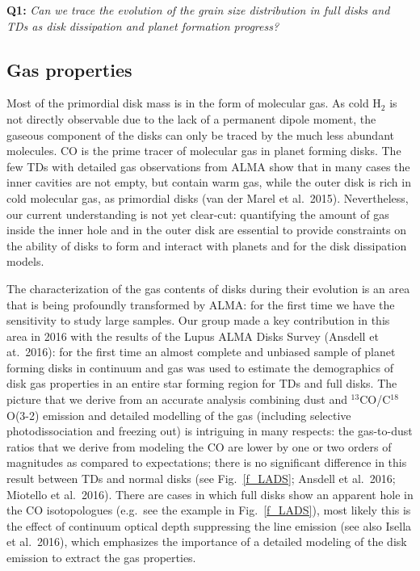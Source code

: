 \documentclass[10pt,fleqn,twoside]{article}
\begin{document}
\smallskip
{\bf Q1:} {\it Can we trace the evolution of the grain size distribution in full disks and TDs as disk dissipation and planet formation progress?}

\subsection{Gas properties}
Most of the primordial disk mass is in the form of molecular gas. As cold H$_2$ is not directly observable due to the lack of a permanent dipole moment, the gaseous component of the disks can only be traced by the much less abundant molecules. CO is the prime tracer of molecular gas in planet forming disks. The few TDs with detailed gas observations from ALMA show that in many cases the inner cavities are not empty, but contain warm gas, while the outer disk is rich in cold molecular gas, as primordial disks (van der Marel et al.~2015). Nevertheless, our current understanding is not yet clear-cut: quantifying the amount of gas inside the inner hole and in the outer disk are essential to provide constraints on the ability of disks to form and interact with planets and for the disk dissipation models.

The characterization of the gas contents of disks during their evolution is an area that is being profoundly transformed by ALMA: for the first time we have the sensitivity to study large samples.
Our group made a key contribution in this area in 2016 with the results of the Lupus ALMA Disks Survey
(Ansdell et at.~2016): for the first time an almost complete and unbiased sample of planet forming disks in continuum and gas was used to estimate the demographics of disk gas properties in an entire star forming region for TDs and full disks. The picture that we derive from an accurate analysis combining dust and $^{13}$CO/C$^{18}$O(3-2) emission and detailed modelling of the gas (including selective photodissociation and freezing out) is intriguing in many respects: the gas-to-dust ratios that we derive from modeling the CO are lower by one or two orders of magnitudes as compared to expectations; there is no significant difference in this result between TDs and normal disks (see Fig.~\ref{f_LADS}; Ansdell et al.~2016; Miotello et al.~2016). There are cases in which full disks show an apparent hole in the CO isotopologues (e.g.\ see the example in Fig.~\ref{f_LADS}), most likely this is the effect of continuum optical depth suppressing the line emission (see also Isella et al.~2016), which emphasizes the importance of a detailed modeling of the disk emission to extract the gas properties.
\end{document}
